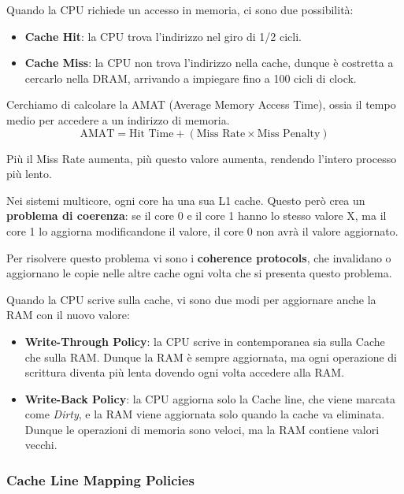 \documentclass[11pt, a4paper, titlepage, oneside]{scrbook}
\begin{document}
Quando la CPU richiede un accesso in memoria, ci sono due possibilità:
\begin{itemize}
    \item \textbf{Cache Hit}: la CPU trova l'indirizzo nel giro di 1/2 cicli.
    \item \textbf{Cache Miss}: la CPU non trova l'indirizzo nella cache, dunque è costretta a cercarlo nella DRAM, arrivando a impiegare fino a 100 cicli di clock.
\end{itemize}

Cerchiamo di calcolare la AMAT (Average Memory Access Time), ossia il tempo medio per accedere a un indirizzo di memoria.
\[
\text{AMAT} = \text{Hit Time} + (\text{Miss Rate} \times \text{Miss Penalty})
\]

Più il Miss Rate aumenta, più questo valore aumenta, rendendo l'intero processo più lento.

\begin{Osservazione}
\label{oss-cache-coherence-problem}
Nei sistemi multicore, ogni core ha una sua L1 cache. Questo però crea un \textbf{problema di coerenza}: se il core 0 e il core 1 hanno lo stesso valore X, ma il core 1 lo aggiorna modificandone il valore, il core 0 non avrà il valore aggiornato.
\end{Osservazione}

Per risolvere questo problema vi sono i \textbf{coherence protocols}, che invalidano o aggiornano le copie nelle altre cache ogni volta che si presenta questo problema. 

\begin{Proprieta}
\label{prop-cache-write-policies}
Quando la CPU scrive sulla cache, vi sono due modi per aggiornare anche la RAM con il nuovo valore:
\begin{itemize}
    \item \textbf{Write-Through Policy}: la CPU scrive in contemporanea sia sulla Cache che sulla RAM. Dunque la RAM è sempre aggiornata, ma ogni operazione di scrittura diventa più lenta dovendo ogni volta accedere alla RAM.
    \item \textbf{Write-Back Policy}: la CPU aggiorna solo la Cache line, che viene marcata come \textit{Dirty}, e la RAM viene aggiornata solo quando la cache va eliminata. Dunque le operazioni di memoria sono veloci, ma la RAM contiene valori vecchi.
\end{itemize}
\end{Proprieta}

\subsubsection*{Cache Line Mapping Policies}
\end{document}
